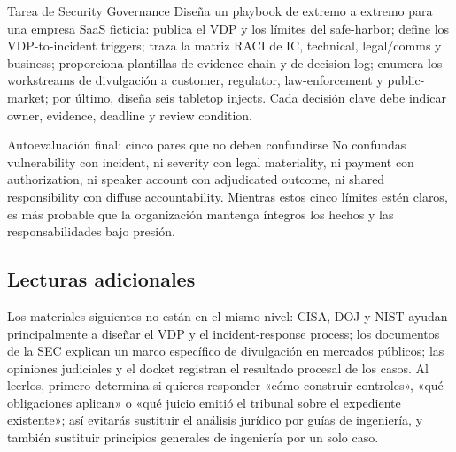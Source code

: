 \documentclass[a4paper]{article}
\begin{document}
\begin{importantbox}{Tarea de Security Governance}
Diseña un playbook de extremo a extremo para una empresa SaaS ficticia: publica el VDP y los límites del safe-harbor; define los VDP-to-incident triggers; traza la matriz RACI de IC, technical, legal/comms y business; proporciona plantillas de evidence chain y de decision-log; enumera los workstreams de divulgación a customer, regulator, law-enforcement y public-market; por último, diseña seis tabletop injects. Cada decisión clave debe indicar owner, evidence, deadline y review condition.
\end{importantbox}

\begin{knowledgebox}{Autoevaluación final: cinco pares que no deben confundirse}
No confundas vulnerability con incident, ni severity con legal materiality, ni payment con authorization, ni speaker account con adjudicated outcome, ni shared responsibility con diffuse accountability. Mientras estos cinco límites estén claros, es más probable que la organización mantenga íntegros los hechos y las responsabilidades bajo presión.
\end{knowledgebox}

\subsection{Lecturas adicionales}

Los materiales siguientes no están en el mismo nivel: CISA, DOJ y NIST ayudan principalmente a diseñar el VDP y el incident-response process; los documentos de la SEC explican un marco específico de divulgación en mercados públicos; las opiniones judiciales y el docket registran el resultado procesal de los casos. Al leerlos, primero determina si quieres responder «cómo construir controles», «qué obligaciones aplican» o «qué juicio emitió el tribunal sobre el expediente existente»; así evitarás sustituir el análisis jurídico por guías de ingeniería, y también sustituir principios generales de ingeniería por un solo caso.
\end{document}
